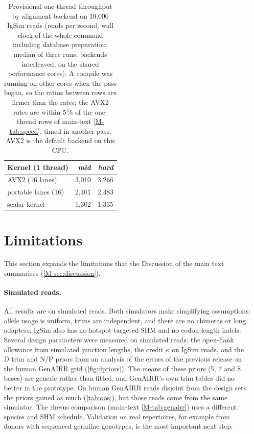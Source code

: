 \documentclass[11pt,a4paper]{article}
\begin{document}
\begin{table}[tbp]
\centering
\caption{Provisional one-thread throughput by alignment backend on 10,000
IgSim reads (reads per second; wall clock of the whole command including
database preparation; median of three runs, backends interleaved, on the
shared performance cores). A compile was running on other cores when the
pass began, so the ratios between rows are firmer than the rates; the AVX2
rates are within 5\,\% of the one-thread \swig{} rows of main-text
\cref{M-tab:speed}, timed in another pass. AVX2 is the default backend on
this CPU.}
\label{tab:kernels}
\footnotesize
\begin{tabular}{@{}l rr@{}}
\toprule
Kernel (1 thread) & \emph{mid} & \emph{hard} \\
\midrule
AVX2 (16 lanes)           & 3,010  & 3,266 \\
portable lanes (16)       & 2,401  & 2,483 \\
scalar kernel             & 1,302  & 1,335 \\
\bottomrule
\end{tabular}
\end{table}

\FloatBarrier
\section{Limitations}
\label{sec:limitations}

This section expands the limitations that the Discussion of the main text
summarises (\cref{M-sec:discussion}).

\paragraph{Simulated reads.} All results are on simulated reads. Both
simulators make simplifying assumptions: allele usage is uniform, trims are
independent, and there are no chimeras or long adapters; IgSim also has no
hotspot-targeted SHM and no codon-length indels. Several design parameters
were measured on simulated reads: the open-flank allowance from simulated
junction lengths, the credit $\kappa$ on IgSim reads, and the D trim and N/P
priors from an analysis of the errors of the previous release on the human
GenAIRR grid (\cref{fig:dpriors}). The means of these priors (5, 7 and 8
bases) are generic rather than fitted, and GenAIRR's own trim tables did no
better in the prototype. On human GenAIRR reads disjoint from the design
sets the priors gained as much (\cref{tab:oos}), but those reads come from
the same simulator. The rhesus comparison (main-text \cref{M-tab:genairr})
uses a different species and SHM schedule. Validation on real repertoires,
for example from donors with sequenced germline genotypes, is the most
important next step.
\end{document}
